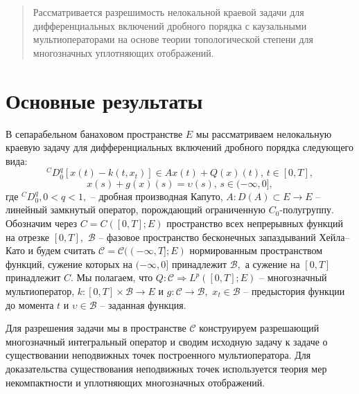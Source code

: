 \maketitle

\begin{abstract}
Рассматривается разрешимость нелокальной краевой задачи для дифференциальных включений дробного порядка с каузальными мультиоператорами на основе теории топологической степени для многозначных уплотняющих отображений.

\end{abstract}

\section{Основные результаты} %

В сепарабельном банаховом пространстве $E$ мы рассматриваем нелокальную краевую задачу для дифференциальных включений дробного порядка следующего вида:
$$
^{C}D^{q}_{0}[x(t)-k(t,x_t)]\in Ax(t)+Q(x)(t), \, t\in [0,T],
$$
$$
x(s)+g(x)(s)=\upsilon(s), \, s\in (-\infty,0],
$$
где $^{C}D^{q}_{0}, 0<q<1,$ -- дробная производная Капуто, $A: D(A)\subset E\to E$ -- линейный замкнутый оператор, порождающий ограниченную $C_0$-полугруппу. Обозначим через $C=C([0,T];E)$ пространство всех непрерывных функций на отрезке $[0,T],$ $\mathcal{B}$ -- фазовое пространство бесконечных запаздываний Хейла--Като и будем считать $\mathcal{C}=\mathcal{C}((-\infty,T];E)$ нормированным пространством функций, сужение которых на $(-\infty,0]$ принадлежит $\mathcal{B},$ а сужение на $[0,T]$ принадлежит $C.$ Мы полагаем, что $Q:\mathcal{C} \Rightarrow L^p ([0,T];E)$ -- многозначный мультиоператор, $k:[0,T]\times \mathcal{B} \to E$ и $g: \mathcal{C} \to \mathcal{B},$ $x_t\in \mathcal{B}$ -- предыстория функции до момента $t$ и $\upsilon \in \mathcal{B}$ -- заданная функция.

Для разрешения задачи мы в пространстве $\mathcal{C}$ конструируем разрешающий многозначный интегральный оператор и сводим исходную задачу к задаче о существовании неподвижных точек построенного мультиоператора. Для доказательства существования неподвижных точек используется теория мер некомпактности и уплотняющих многозначных отображений.









